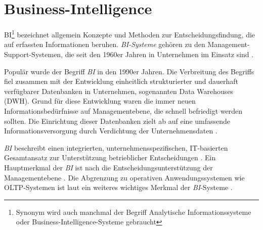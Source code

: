 

\section{Business-Intelligence}
\label{chap:two_three}
\acrfull{BI}\footnote{Synonym wird auch manchmal der Begriff Analytische Informationssysteme oder Business-Intelligence-Systeme gebraucht}
bezeichnet allgemein Konzepte und Methoden zur Entscheidungsfindung, die auf
erfassten Informationen beruhen. 
\textit{\acrshort{BI}-Systeme} gehören zu den Management-Support-Systemen, die seit den 1960er Jahren in Unternehmen im Einsatz sind \cite[vgl.][83]{gronwald_integrierte_2020}.

Populär wurde der Begriff \textit{\acrshort{BI}} in den 1990er Jahren. Die Verbreitung des Begriffs fiel zusammen mit der 
Entwicklung einheitlich strukturierter und dauerhaft verfügbarer Datenbanken in Unternehmen, sogenannten Data Warehouses (DWH). 
Grund für diese Entwicklung waren die immer neuen Informationsbedürfnisse auf Managementebene, die schnell befriedigt werden sollten.
Die Einrichtung dieser Datenbanken zielt ab auf eine umfassende Informationsversorgung durch Verdichtung der Unternehmensdaten 
\cite[vgl.][268 ff.]{abts_grundkurs_2017}. 

\textit{\acrshort{BI}} beschreibt einen integrierten, unternehmensspezifischen,
IT-basierten Gesamtansatz zur Unterstützung betrieblicher Entscheidungen \cite[vgl.][270]{abts_grundkurs_2017}. 
Ein Hauptmerkmal der \textit{\acrshort{BI}} ist nach  die Entscheidungsunterstützung der Managementebene
\cite[vgl.][111]{linden_geschaftsmodellbasierte_2016}. Die Abgrenzung zu operativen
Anwendungssystemen wie \acrfull{OLTP}-Systemen ist laut \citeauthor{abts_grundkurs_2017} ein weiteres wichtiges Merkmal der \textit{\acrshort{BI}}-Systeme \cite[vgl.][267]{abts_grundkurs_2017}. 

